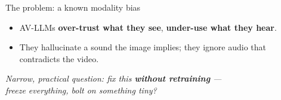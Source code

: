 \documentclass[aspectratio=169,11pt]{beamer}
\begin{document}
\begin{frame}{The problem: a known modality bias}
\begin{itemize}
\item AV-LLMs \textbf{over-trust what they see}, \textbf{under-use what they hear}.
\item They hallucinate a sound the image implies; they ignore audio that contradicts the video.
\end{itemize}
\vfill
\begin{center}\large\itshape
Narrow, practical question: fix this \textbf{without retraining} ---\\ freeze everything, bolt on something tiny?
\end{center}
\end{frame}

\end{document}
